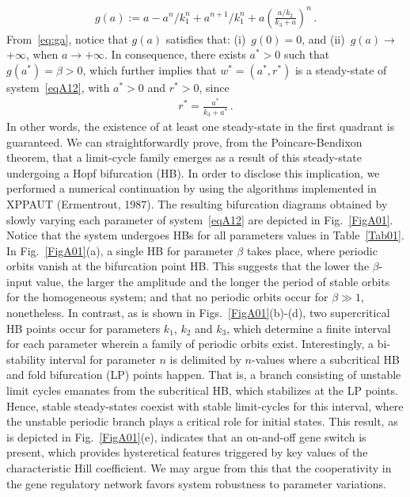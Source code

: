 \documentclass[11pt]{article}
\begin{document}
	\begin{gather}\label{eq:ga}
		g(a):=a-a^n/k_1^n+a^{n+1}/k_1^n +a\left(\frac{a/k_2}{k_3+a}\right)^n\,.
	\end{gather}
	{From~\eqref{eq:ga}, notice that $g(a)$ satisfies that: (i)~$g(0) = 0$, and (ii)~$g(a)\rightarrow$ +$\infty$, when  $a\rightarrow +\infty$. In consequence, there exists $a^*>0$ such that $g(a^*) = \beta> 0 $, which further implies that $w^*=(a^*, r^*)$ is a steady-state of system~\eqref{eqA12}, with $a^* >0$ and $r^*>0$, since }
	\begin{gather*}
	r^* = \frac{a^*}{k_3+a^*}\,.
	\end{gather*}
	In other words, the existence of at least one steady-state in the first quadrant is guaranteed. We can straightforwardly  prove, from the Poincare-Bendixon theorem, that a limit-cycle family emerges as a result of this steady-state undergoing a Hopf bifurcation (HB). In order to disclose this implication, we performed a numerical continuation by using the algorithms implemented in XPPAUT (Ermentrout, 1987). The resulting bifurcation diagrams obtained by slowly varying each parameter of system~\eqref{eqA12} are depicted in Fig.~\ref{FigA01}. Notice that the system undergoes HBs for all parameters values in Table~\ref{Tab01}. In Fig.~\ref{FigA01}(a), a single HB for parameter $\beta$ takes place, where periodic orbits vanish at the bifurcation point HB. This suggests that the lower the $\beta$-input value, the larger the amplitude and the longer the period of stable orbits for the homogeneous system; and that no periodic orbits occur for $\beta\gg1$, nonetheless. In contrast, as is shown in Figs.~\ref{FigA01}(b)-(d), two supercritical HB points occur for parameters $k_1$, $k_2$ and $k_3$, which determine a finite interval for each parameter wherein a family of periodic orbits exist. Interestingly, a bi-stability interval for parameter $n$ is delimited by $n$-values where a subcritical HB and fold bifurcation (LP) points happen. That is, a branch consisting of unstable limit cycles emanates from the subcritical HB, which stabilizes at the LP points. Hence, stable steady-states coexist with stable limit-cycles for this interval, where the unstable periodic branch plays a critical role for initial states. This result, as is depicted in Fig.~\ref{FigA01}(e), indicates that an on-and-off gene switch is present, which provides hysteretical features triggered by key values of the characteristic Hill coefficient. We may argue from this that the cooperativity in the gene regulatory network favors system robustness to parameter variations.
	
\end{document}

